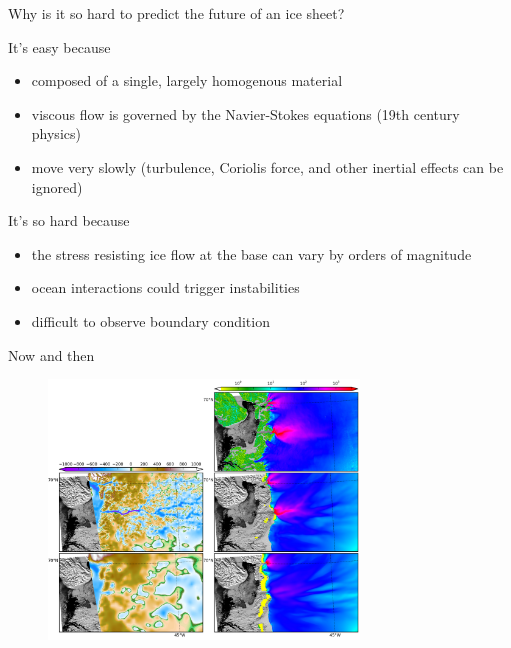 \documentclass[hide notes,intlimits,unknownkeysallowed]{beamer}
\begin{document}
\begin{frame}{Why is it so hard to predict the future of an ice
    sheet?}
  \vspace{-.5em}
  \begin{block}{It's easy because}
   \begin{itemize}
    \item composed of a single, largely homogenous material
    \item viscous flow is governed by the Navier-Stokes equations (19th century physics)
    \item move very slowly (turbulence, Coriolis force, and other inertial effects can be ignored)
   \end{itemize}
  \end{block}
  \begin{block}{It's so hard because}
   \begin{itemize}
    \item the stress resisting ice flow at the base can vary by orders of magnitude
    \item ocean interactions could trigger instabilities
    \item difficult to observe boundary condition
  \end{itemize}
  \end{block}
\end{frame}

\begin{frame}{Now and then}
     \begin{figure}
       \includegraphics[width=8.25cm]{figures/bed_elev_speeds}
     \end{figure}
\end{frame}
\end{document}

